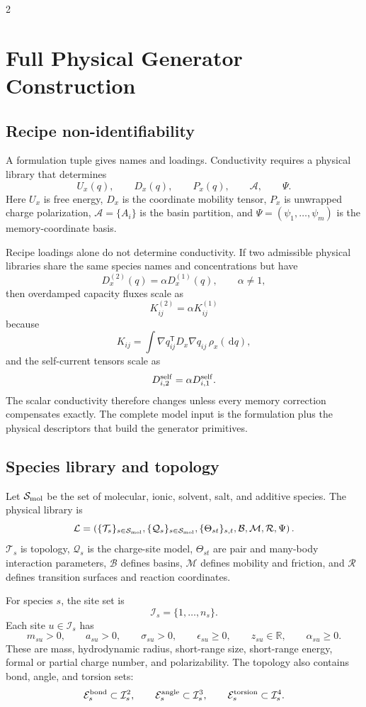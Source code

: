 \documentclass[10pt]{article}
\newcommand{\dd}{\,\mathrm d}
\newcommand{\T}{\mathsf{T}}
\begin{document}
\begin{multicols}{2}
\section{Full Physical Generator Construction}
\label{sec:fullgenerator}

\subsection{Recipe non-identifiability}

A formulation tuple gives names and loadings. Conductivity requires a physical
library that determines
\[
U_x(q),\qquad D_x(q),\qquad P_x(q),\qquad \mathcal A,\qquad \Psi.
\]
Here \(U_x\) is free energy, \(D_x\) is the coordinate mobility tensor, \(P_x\)
is unwrapped charge polarization, \(\mathcal A=\{A_i\}\) is the basin partition,
and \(\Psi=(\psi_1,\ldots,\psi_m)\) is the memory-coordinate basis.

Recipe loadings alone do not determine conductivity. If two admissible physical
libraries share the same species names and concentrations but have
\[
D_x^{(2)}(q)=\alpha D_x^{(1)}(q),
\qquad
\alpha\ne1,
\]
then overdamped capacity fluxes scale as
\[
K_{ij}^{(2)}
=
\alpha K_{ij}^{(1)}
\]
because
\[
K_{ij}
=
\int
\nabla q_{ij}^{\T}D_x\nabla q_{ij}\,\rho_x(\dd q),
\]
and the self-current tensors scale as
\[
D_{i,2}^{\rm self}=\alpha D_{i,1}^{\rm self}.
\]
The scalar conductivity therefore changes unless every memory correction
compensates exactly. The complete model input is the formulation plus the
physical descriptors that build the generator primitives.

\subsection{Species library and topology}

Let \(\mathcal S_{\rm mol}\) be the set of molecular, ionic, solvent, salt, and
additive species. The physical library is
\[
\mathcal L=
\left(
\{\mathcal T_s\}_{s\in\mathcal S_{\rm mol}},
\{\mathcal Q_s\}_{s\in\mathcal S_{\rm mol}},
\{\Theta_{st}\}_{s,t},
\mathcal B,
\mathcal M,
\mathcal R,
\Psi
\right).
\]
\(\mathcal T_s\) is topology, \(\mathcal Q_s\) is the charge-site model,
\(\Theta_{st}\) are pair and many-body interaction parameters, \(\mathcal B\)
defines basins, \(\mathcal M\) defines mobility and friction, and
\(\mathcal R\) defines transition surfaces and reaction coordinates.

For species \(s\), the site set is
\[
\mathcal I_s=\{1,\ldots,n_s\}.
\]
Each site \(u\in\mathcal I_s\) has
\[
m_{su}>0,\qquad
a_{su}>0,\qquad
\sigma_{su}>0,\qquad
\epsilon_{su}\ge0,\qquad
z_{su}\in\mathbb R,\qquad
\alpha_{su}\ge0.
\]
These are mass, hydrodynamic radius, short-range size, short-range energy,
formal or partial charge number, and polarizability. The topology also contains
bond, angle, and torsion sets:
\[
\mathcal E_s^{\rm bond}\subset\mathcal I_s^2,\qquad
\mathcal E_s^{\rm angle}\subset\mathcal I_s^3,\qquad
\mathcal E_s^{\rm torsion}\subset\mathcal I_s^4.
\]


\end{multicols}
\end{document}
